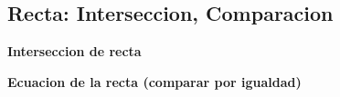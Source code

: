 \subsection{Recta: Interseccion, Comparacion}
    \textbf{Interseccion de recta}
    

    \textbf{Ecuacion de la recta (comparar por igualdad)}
    